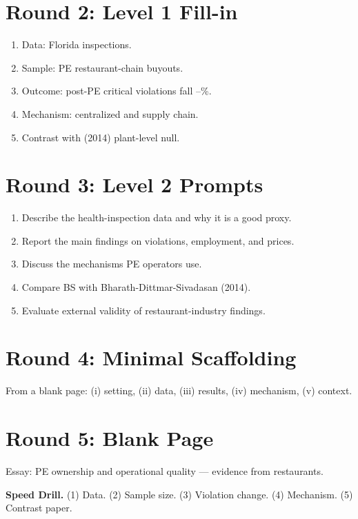 \documentclass[11pt]{article}
\newcommand{\blank}[1]{\underline{\hspace{#1}}}
\begin{document}
\section*{Round 2: Level 1 Fill-in}
\begin{enumerate}
\item Data: Florida \blank{2cm} inspections.
\item Sample: \blank{1cm} PE restaurant-chain buyouts.
\item Outcome: post-PE critical violations fall \blank{1cm}--\blank{1cm}\%.
\item Mechanism: centralized \blank{2cm} and supply chain.
\item Contrast with \blank{1cm} (2014) plant-level null.
\end{enumerate}

\section*{Round 3: Level 2 Prompts}
\begin{enumerate}
\item Describe the health-inspection data and why it is a good proxy.
\item Report the main findings on violations, employment, and prices.
\item Discuss the mechanisms PE operators use.
\item Compare BS with Bharath-Dittmar-Sivadasan (2014).
\item Evaluate external validity of restaurant-industry findings.
\end{enumerate}

\section*{Round 4: Minimal Scaffolding}
From a blank page: (i) setting, (ii) data, (iii) results, (iv) mechanism, (v) context.

\section*{Round 5: Blank Page}
Essay: PE ownership and operational quality --- evidence from restaurants.

\vspace{6pt}
\begin{drillbox}
\textbf{Speed Drill.} (1) Data. (2) Sample size. (3) Violation change. (4) Mechanism. (5) Contrast paper.
\end{drillbox}
\end{document}
